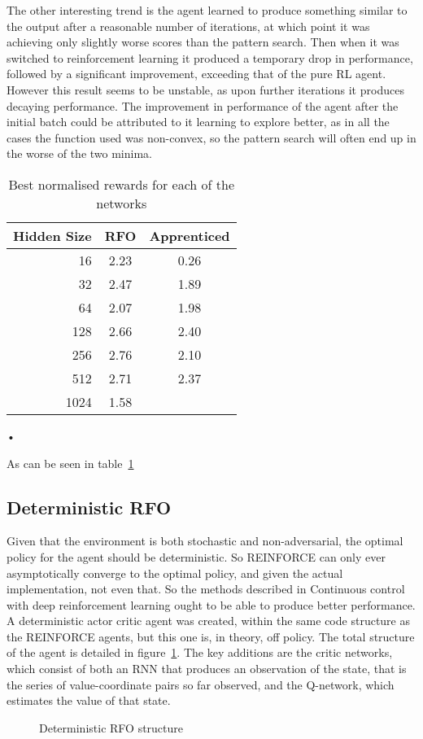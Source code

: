 The other interesting trend is the agent learned to produce something similar to the output after a reasonable number of iterations, at which point it was achieving only slightly worse scores than the pattern search. Then when it was switched to reinforcement learning it produced a temporary drop in performance, followed by a significant improvement, exceeding that of the pure RL agent. However this result seems to be unstable, as upon further iterations it produces decaying performance. The improvement in performance of the agent after the initial batch could be attributed to it learning to explore better, as in all the cases the function used was non-convex, so the pattern search will often end up in the worse of the two minima.

\begin{table}[hbtp]
\centering
\begin{tabular}{r | cc}
Hidden Size & RFO & Apprenticed \\
\hline
16 & 2.23 & 0.26 \\
32 & 2.47 & 1.89 \\
64 & 2.07 & 1.98\\
128 & 2.66 & 2.40 \\
256 & 2.76 & 2.10 \\
512 & 2.71 & 2.37 \\
1024 & 1.58 & \\

\end{tabular}


\caption{Best normalised rewards for each of the networks}
\label{tab:compare}

\end{table}•

As can be seen in table~\ref{tab:compare}

\subsection{Deterministic RFO}
\label{sec:detrfo}
Given that the environment is both stochastic and non-adversarial, the optimal policy for the agent should be deterministic. So REINFORCE can only ever asymptotically converge to the optimal policy, and given the actual implementation, not even that. So the methods described in Continuous control with deep reinforcement learning\cite{lillicrap2015continuous} ought to be able to produce better performance. A deterministic actor critic agent was created, within the same code structure as the REINFORCE agents, but this one is, in theory, off policy. The total structure of the agent is detailed in figure~\ref{fig:detrfo}. The key additions are the critic networks, which consist of both an RNN that produces an observation of the state, that is the series of value-coordinate pairs so far observed, and the Q-network, which estimates the value of that state.
\begin{figure}
\centering

\caption{Deterministic RFO structure}
\label{fig:detrfo}
\end{figure}

